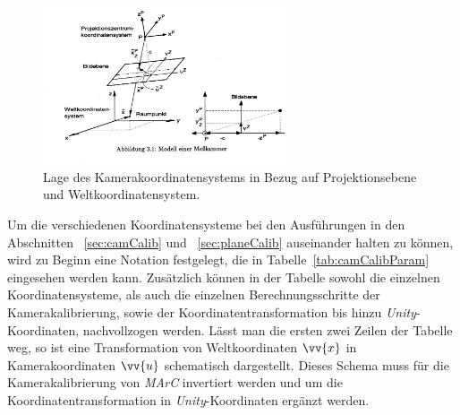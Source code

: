 \begin{figure}[H]
		\centering
		\includegraphics[width=0.65\textwidth , trim = 0mm 65mm 270mm 0mm, clip]{Bilder/cameraCalib.jpg}
			\caption[Lage des Kamerakoordinatensystems]{Lage des Kamerakoordinatensystems in Bezug auf Projektionsebene und Weltkoordinatensystem. \cite{Meisel:77890}}
			\label{fig:cameraCalib}
	\end{figure}

Um die verschiedenen Koordinatensysteme bei den Ausführungen in den Abschnitten ~\ref{sec:camCalib} und ~\ref{sec:planeCalib} auseinander halten zu können, wird zu Beginn eine Notation festgelegt, die in Tabelle~\ref{tab:camCalibParam} eingesehen werden kann. Zusätzlich können in der Tabelle sowohl die einzelnen Koordinatensysteme, als auch die einzelnen Berechnungsschritte der Kamerakalibrierung, sowie der Koordinatentransformation bis hinzu \emph{Unity}-Koordinaten, nachvollzogen werden. Lässt man die ersten zwei Zeilen der Tabelle weg, so ist eine Transformation von Weltkoordinaten $\vv{x}$ in Kamerakoordinaten $\vv{u}$ schematisch dargestellt. Dieses Schema muss für die Kamerakalibrierung von \textit{MArC} invertiert werden und um die Koordinatentransformation in \emph{Unity}-Koordinaten ergänzt werden.\\

